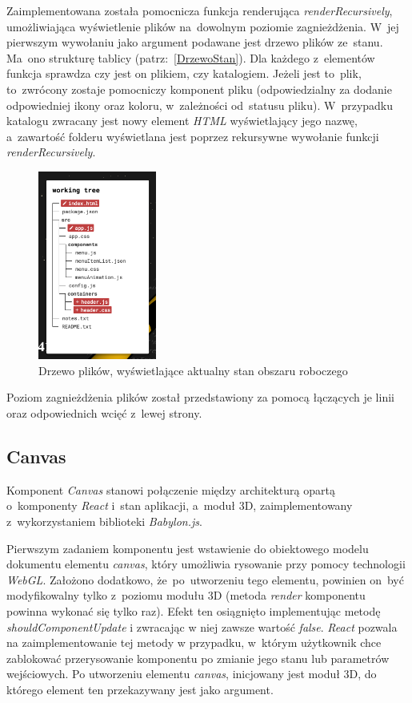 \documentclass[12pt,a4paper,polish,thesis]{dcsbook}
\begin{document}
{	Zaimplementowana została pomocnicza funkcja renderująca \textit{renderRecursively}, umożliwiająca wyświetlenie plików na~dowolnym poziomie zagnieżdżenia. W~jej pierwszym wywołaniu jako argument podawane jest drzewo plików ze~stanu. Ma~ono strukturę tablicy (patrz:~\ref{DrzewoStan}). Dla każdego z~elementów funkcja sprawdza czy jest on plikiem, czy katalogiem. Jeżeli jest to~plik, to~zwrócony zostaje pomocniczy komponent pliku (odpowiedzialny za dodanie odpowiedniej ikony oraz koloru, w~zależności od~statusu pliku). W~przypadku katalogu zwracany jest nowy element \textit{HTML} wyświetlający jego nazwę, a~zawartość folderu wyświetlana jest poprzez rekursywne wywołanie funkcji \textit{renderRecursively}.

	\begin{figure}[h]
		\centering
		\includegraphics[height=6.2cm]{component-tree}
		\caption{Drzewo plików, wyświetlające aktualny stan obszaru roboczego}
		\label{fig:tree}
	\end{figure}

	Poziom zagnieżdżenia plików został przedstawiony za pomocą łączących je linii oraz odpowiednich wcięć z~lewej strony.
	\FloatBarrier

	\subsection{Canvas}

	Komponent \textit{Canvas} stanowi połączenie między architekturą opartą o~komponenty \textit{React} i~stan aplikacji, a~moduł 3D, zaimplementowany z~wykorzystaniem biblioteki \textit{Babylon.js}.

	Pierwszym zadaniem komponentu jest wstawienie do obiektowego modelu dokumentu elementu \textit{canvas}, który umożliwia rysowanie przy pomocy technologii \textit{WebGL}. Założono dodatkowo, że~po~utworzeniu tego elementu, powinien on~być modyfikowalny tylko z~poziomu modułu 3D (metoda \textit{render} komponentu powinna wykonać się tylko raz). Efekt ten osiągnięto implementując metodę \textit{shouldComponentUpdate} i zwracając w niej zawsze wartość \textit{false}. \textit{React} pozwala na zaimplementowanie tej metody w przypadku, w~którym użytkownik chce zablokować przerysowanie komponentu po zmianie jego stanu lub parametrów wejściowych. Po utworzeniu elementu \textit{canvas}, inicjowany jest moduł 3D, do którego element ten przekazywany jest jako argument.

}
\end{document}
